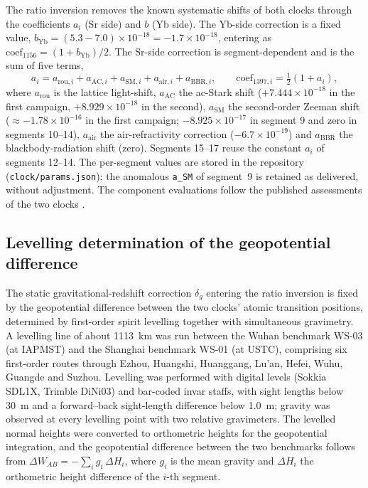 \documentclass[11pt,a4paper]{article}
\newcommand{\dW}{\Delta W}
\newcommand{\e}[1]{\times 10^{#1}}
\begin{document}
The ratio inversion removes the known systematic shifts of both clocks
through the coefficients $a_i$ (Sr side) and $b$ (Yb side). The Yb-side
correction is a fixed value, $b_{\mathrm{Yb}} = (5.3 - 7.0)\times10^{-18}
= -1.7\e{-18}$, entering as $\mathrm{coef}_{1156} = (1+b_{\mathrm{Yb}})/2$.
The Sr-side correction is segment-dependent and is the sum of five terms,
\begin{equation}
  a_i = a_{\mathrm{rou},i} + a_{\mathrm{AC},i} + a_{\mathrm{SM},i}
        + a_{\mathrm{air},i} + a_{\mathrm{BBR},i},
  \qquad \mathrm{coef}_{1397,i} = \tfrac{1}{2}(1+a_i),
  \label{eq:shifta}
\end{equation}
where $a_{\mathrm{rou}}$ is the lattice light-shift, $a_{\mathrm{AC}}$
the ac-Stark shift ($+7.444\e{-18}$ in the first campaign, $+8.929\e{-18}$
in the second), $a_{\mathrm{SM}}$ the second-order Zeeman shift
($\approx-1.78\e{-16}$ in the first campaign; $-8.925\e{-17}$ in segment 9
and zero in segments 10--14), $a_{\mathrm{air}}$ the air-refractivity
correction ($-6.7\e{-19}$) and $a_{\mathrm{BBR}}$ the blackbody-radiation
shift (zero). Segments 15--17 reuse the constant $a_i$ of segments
12--14. The per-segment values are stored in the repository
(\texttt{clock/params.json}); the anomalous \texttt{a\_SM} of segment~9 is
retained as delivered, without adjustment. The component evaluations
follow the published assessments of the two clocks
\citep{zhu2026yb, jia2026sr}.


\subsection{Levelling determination of the geopotential difference}
\label{app:levelling}

The static gravitational-redshift correction $\delta_g$ entering the ratio
inversion is fixed by the geopotential difference between the two clocks'
atomic transition positions, determined by first-order spirit levelling
together with simultaneous gravimetry. A levelling line of about \qty{1113}{km}
was run between the Wuhan benchmark WS-03 (at IAPMST) and the Shanghai
benchmark WS-01 (at USTC), comprising six first-order routes through
Ezhou, Huangshi, Huanggang, Lu'an, Hefei, Wuhu, Guangde and Suzhou.
Levelling was performed with digital levels (Sokkia SDL1X, Trimble
DiNi03) and bar-coded invar staffs, with sight lengths below \qty{30}{m} and a
forward--back sight-length difference below \qty{1.0}{m}; gravity was
observed at every levelling point with two relative gravimeters. The
levelled normal heights were converted to orthometric heights for the
geopotential integration, and the geopotential difference between the two
benchmarks follows from $\dW_{AB} = -\sum_i g_i\,\Delta H_i$, where $g_i$
is the mean gravity and $\Delta H_i$ the orthometric height difference of
the $i$-th segment.
\end{document}
